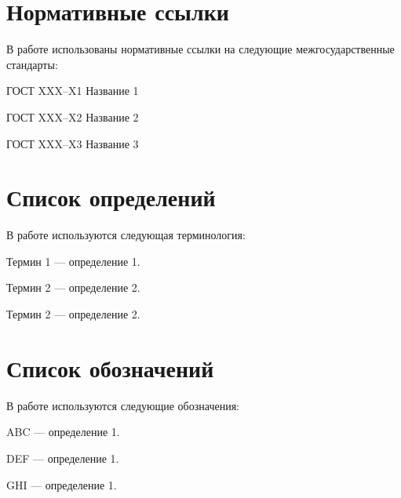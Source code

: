 \chapter*{Нормативные ссылки}


\noindent В работе использованы нормативные ссылки на следующие межгосударственные стандарты:

\noindent ГОСТ XXX--X1 Название 1

\noindent ГОСТ XXX--X2 Название 2

\noindent ГОСТ XXX--X3 Название 3

\chapter*{Список определений}

\noindent В работе используются следующая терминология:

\noindent Термин 1 --- определение 1.

\noindent Термин 2 --- определение 2.

\noindent Термин 2 --- определение 2.

\chapter*{Список обозначений}

\noindent В работе используются следующие обозначения:

\noindent ABC --- определение 1.

\noindent DEF --- определение 1.

\noindent GHI --- определение 1.

\clearpage